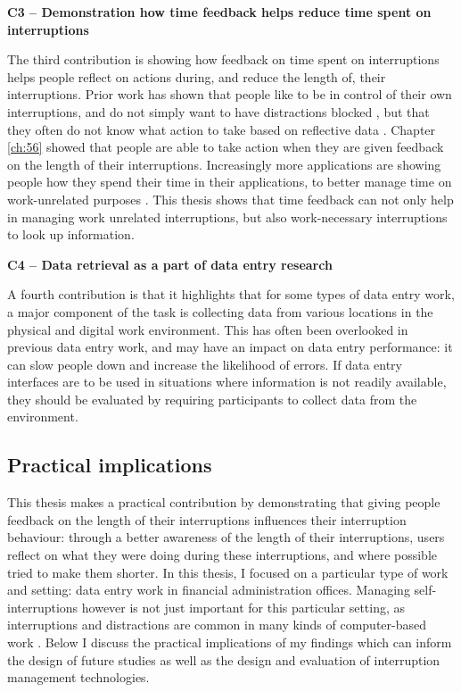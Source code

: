 \textbf{C3 – Demonstration how time feedback helps reduce time spent on interruptions}

The third contribution is showing how feedback on time spent on interruptions helps people reflect on actions during, and reduce the length of, their interruptions. Prior work has shown that people like to be in control of their own interruptions, and do not simply want to have distractions blocked \citep{Mark2018}, but that they often do not know what action to take based on reflective data \citep{Collins2014, Whittaker2016}. Chapter \ref{ch:56} showed that people are able to take action when they are given feedback on the length of their interruptions. Increasingly more applications are showing people how they spend their time in their applications, to better manage time on work-unrelated purposes \citep{Constine2018, Constine2018a, Lynley2018}. This thesis shows that time feedback can not only help in managing work unrelated interruptions, but also work-necessary interruptions to look up information.

\textbf{C4 – Data retrieval as a part of data entry research}

A fourth contribution is that it highlights that for some types of data entry work, a major component of the task is collecting data from various locations in the physical and digital work environment. This has often been overlooked in previous data entry work, and may have an impact on data entry performance: it can slow people down and increase the likelihood of errors. If data entry interfaces are to be used in situations where information is not readily available, they should be evaluated  by requiring participants to collect data from the environment.

\subsection{Practical implications}
This thesis makes a practical contribution by demonstrating that giving people feedback on the length of their interruptions influences their interruption behaviour: through a better awareness of the length of their interruptions, users reflect on what they were doing during these interruptions, and where possible tried to make them shorter. In this thesis, I focused on a particular type of work and setting: data entry work in financial administration offices. Managing self-interruptions however is not just important for this particular setting, as interruptions and distractions are common in many kinds of computer-based work \citep{Gonzalez2004}. Below I discuss the practical implications of my findings which can inform the design of future studies as well as the design and evaluation of interruption management technologies. 

